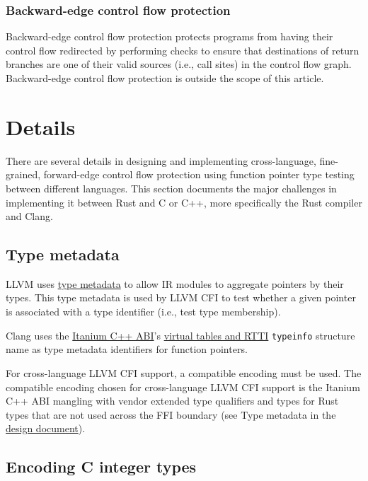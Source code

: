 \documentclass{article}
\begin{document}
\subsubsection{Backward-edge control flow protection}

Backward-edge control flow protection protects programs from having their control flow redirected by performing checks to ensure that destinations of return branches are one of their valid sources (i.e., call sites) in the control flow graph. Backward-edge control flow protection is outside the scope of this article.


\section{Details}

There are several details in designing and implementing cross-language, fine-grained, forward-edge control flow protection using function pointer type testing between different languages. This section documents the major challenges in implementing it between Rust and C or C++, more specifically the Rust compiler and Clang.


\subsection{Type metadata}

LLVM uses \href{https://llvm.org/docs/TypeMetadata.html}{type metadata} to allow IR modules to aggregate pointers by their types. This type metadata is used by LLVM CFI to test whether a given pointer is associated with a type identifier (i.e., test type membership).

Clang uses the \href{https://itanium-cxx-abi.github.io/cxx-abi/abi.html}{Itanium C++ ABI}'s \href{https://itanium-cxx-abi.github.io/cxx-abi/abi.html#mangling-special-vtables}{virtual tables and RTTI} \texttt{typeinfo} structure name as type metadata identifiers for function pointers.

For cross-language LLVM CFI support, a compatible encoding must be used. The compatible encoding chosen for cross-language LLVM CFI support is the Itanium C++ ABI mangling with vendor extended type qualifiers and types for Rust types that are not used across the FFI boundary (see Type metadata in the \href{https://rcvalle.com/docs/rust-cfi-design-doc.pdf}{design document}).


\subsection{Encoding C integer types}
\end{document}
